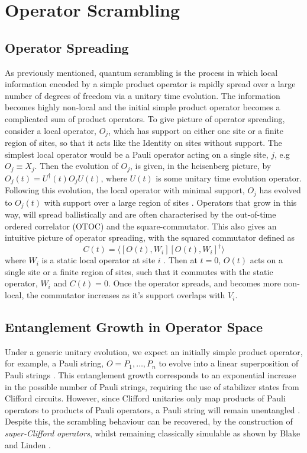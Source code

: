 \section{Operator Scrambling}
\subsection{Operator Spreading}

As previously mentioned, quantum scrambling is the process in which local information
encoded by a simple product operator is rapidly spread over a large number of degrees of freedom via a unitary time evolution.
The information becomes highly non-local and the initial simple product operator becomes a complicated sum of product
operators. To give picture of operator spreading, consider a local operator,
$O_j$, which has support on either one site or a finite region of sites, so that it acts like the Identity on
sites without support. The simplest local operator would be a Pauli operator acting on a single site, $j$, e.g
$O_j \equiv X_j$. Then the evolution of
$O_j$, is given, in the heisenberg picture, by $O_j(t) = U^{\dagger}(t)O_jU(t)$, where $U(t)$ is some unitary time evolution
operator. Following this evolution, the local operator with minimal support, $O_j$ has evolved to $O_j(t)$ with support over a
large region of sites \cite{Khemani_2018}. Operators that grow in this way, will spread ballistically \cite{Roberts_2015, Lieb:1972wy, Schuster_2022} and are often
characterised by the out-of-time ordered correlator (OTOC) \cite{Xu2022} and the square-commutator\cite{Blake_2018}. This also gives an
intuitive picture of operator spreading, with the squared commutator defined as
\begin{equation}
    C(t) = \langle [O(t), W_i][O(t), W_i]^{\dagger}\rangle
\end{equation}
where $W_i$ is a static local operator at site $i$ \cite{https://doi.org/10.48550/arxiv.1804.08655}. Then at $t=0$, $O(t)$
acts on a single site or a finite region of sites, such that it commutes with the static operator, $W_i$ and $C(t) = 0$.
Once the operator spreads, and becomes more non-local, the commutator increases as it's support overlaps with $V_i$.

\subsection{Entanglement Growth in Operator Space}
Under a generic unitary evolution, we expect an initially simple product operator, for example, a Pauli string, $O = P_1, \dots, P_n$
to evolve into a linear superposition of Pauli strings \cite{Roberts_2018, Nahum_2017}. This entanglement growth corresponds to
an exponential increase in the possible number of Pauli strings, requiring the use of stabilizer states from Clifford circuits.
However, since Clifford unitaries only map products of Pauli operators to products of Pauli operators, a Pauli string
will remain unentangled \cite{Nahum_2018}. Despite this, the scrambling behaviour can be recovered, by the construction
of \textit{super-Clifford operators}, whilst remaining classically simulable as shown by Blake and Linden \cite{Blake2020}.

